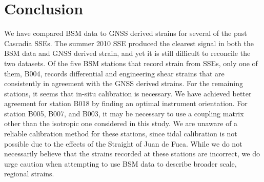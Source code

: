 \documentclass[10pt,a4paper]{article}
\begin{document}
\section{Conclusion}
We have compared BSM data to GNSS derived strains for several of the past Cascadia SSEs. The summer 2010 SSE produced the clearest signal in both the BSM data and GNSS derived strain, and yet it is still difficult to reconcile the two datasets. Of the five BSM stations that record strain from SSEs, only one of them, B004, records differential and engineering shear strains that are consistently in agreement with the GNSS derived strains. For the remaining stations, it seems that in-situ calibration is necessary. We have achieved better agreement for station B018 by finding an optimal instrument orientation. For station B005, B007, and B003, it may be necessary to use a coupling matrix other than the isotropic one considered in this study. We are unaware of a reliable calibration method for these stations, since tidal calibration is not possible due to the effects of the Straight of Juan de Fuca. While we do not necessarily believe that the strains recorded at these stations are incorrect, we do urge caution when attempting to use BSM data to describe broader scale, regional strains.    





  
 
\end{document}
